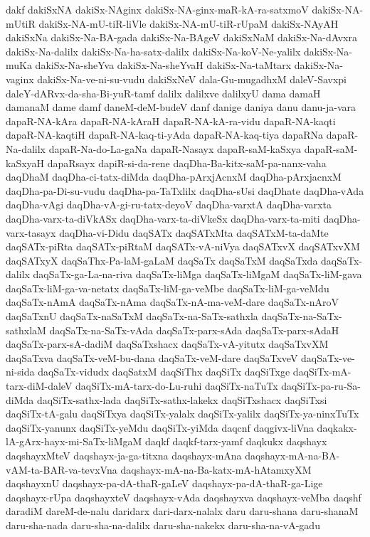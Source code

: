 {dakf
dakiSxNA
dakiSx-NAginx
dakiSx-NA-ginx-maR-kA-ra-satxmoV
dakiSx-NA-mUtiR
dakiSx-NA-mU-tiR-liVle
dakiSx-NA-mU-tiR-rUpaM
dakiSx-NAyAH
dakiSxNa
dakiSx-Na-BA-gada
dakiSx-Na-BAgeV
dakiSxNaM
dakiSx-Na-dAvxra
dakiSx-Na-dalilx
dakiSx-Na-ha-satx-dalilx
dakiSx-Na-koV-Ne-yalilx
dakiSx-Na-muKa
dakiSx-Na-sheYva
dakiSx-Na-sheYvaH
dakiSx-Na-taMtarx
dakiSx-Na-vaginx
dakiSx-Na-ve-ni-su-vudu
dakiSxNeV
dala-Gu-mugadhxM
daleV-Savxpi
daleY-dARvx-da-sha-Bi-yuR-tamf
dalilx
dalilxve
dalilxyU
dama
damaH
damanaM
dame
damf
daneM-deM-budeV
danf
danige
daniya
danu
danu-ja-vara
dapaR-NA-kAra
dapaR-NA-kAraH
dapaR-NA-kA-ra-vidu
dapaR-NA-kaqti
dapaR-NA-kaqtiH
dapaR-NA-kaq-ti-yAda
dapaR-NA-kaq-tiya
dapaRNa
dapaR-Na-dalilx
dapaR-Na-do-La-gaNa
dapaR-Nasayx
dapaR-saM-kaSxya
dapaR-saM-kaSxyaH
dapaRsayx
dapiR-si-da-rene
daqDha-Ba-kitx-saM-pa-nanx-vaha
daqDhaM
daqDha-ci-tatx-diMda
daqDha-pArxjAcnxM
daqDha-pArxjacnxM
daqDha-pa-Di-su-vudu
daqDha-pa-TaTxlilx
daqDha-sUsi
daqDhate
daqDha-vAda
daqDha-vAgi
daqDha-vA-gi-ru-tatx-deyoV
daqDha-varxtA
daqDha-varxta
daqDha-varx-ta-diVkASx
daqDha-varx-ta-diVkeSx
daqDha-varx-ta-miti
daqDha-varx-tasayx
daqDha-vi-Didu
daqSATx
daqSATxMta
daqSATxM-ta-daMte
daqSATx-piRta
daqSATx-piRtaM
daqSATx-vA-niVya
daqSATxvX
daqSATxvXM
daqSATxyX
daqSaThx-Pa-laM-gaLaM
daqSaTx
daqSaTxM
daqSaTxda
daqSaTx-dalilx
daqSaTx-ga-La-na-riva
daqSaTx-liMga
daqSaTx-liMgaM
daqSaTx-liM-gava
daqSaTx-liM-ga-va-netatx
daqSaTx-liM-ga-veMbe
daqSaTx-liM-ga-veMdu
daqSaTx-nAmA
daqSaTx-nAma
daqSaTx-nA-ma-veM-dare
daqSaTx-nAroV
daqSaTxnU
daqSaTx-naSaTxM
daqSaTx-na-SaTx-sathxla
daqSaTx-na-SaTx-sathxlaM
daqSaTx-na-SaTx-vAda
daqSaTx-parx-sAda
daqSaTx-parx-sAdaH
daqSaTx-parx-sA-dadiM
daqSaTxshacx
daqSaTx-vA-yitutx
daqSaTxvXM
daqSaTxva
daqSaTx-veM-bu-dana
daqSaTx-veM-dare
daqSaTxveV
daqSaTx-ve-ni-sida
daqSaTx-vidudx
daqSatxM
daqSiThx
daqSiTx
daqSiTxge
daqSiTx-mA-tarx-diM-daleV
daqSiTx-mA-tarx-do-Lu-ruhi
daqSiTx-naTuTx
daqSiTx-pa-ru-Sa-diMda
daqSiTx-sathx-lada
daqSiTx-sathx-lakekx
daqSiTxshacx
daqSiTxsi
daqSiTx-tA-galu
daqSiTxya
daqSiTx-yalalx
daqSiTx-yalilx
daqSiTx-ya-ninxTuTx
daqSiTx-yanunx
daqSiTx-yeMdu
daqSiTx-yiMda
daqcnf
daqgivx-liVna
daqkakx-lA-gArx-hayx-mi-SaTx-liMgaM
daqkf
daqkf-tarx-yamf
daqkukx
daqshayx
daqshayxMteV
daqshayx-ja-ga-titxna
daqshayx-mAna
daqshayx-mA-na-BA-vAM-ta-BAR-va-tevxVna
daqshayx-mA-na-Ba-katx-mA-hAtamxyXM
daqshayxnU
daqshayx-pa-dA-thaR-gaLeV
daqshayx-pa-dA-thaR-ga-Lige
daqshayx-rUpa
daqshayxteV
daqshayx-vAda
daqshayxva
daqshayx-veMba
daqshf
daradiM
dareM-de-nalu
daridarx
dari-darx-nalalx
daru
daru-shana
daru-shanaM
daru-sha-nada
daru-sha-na-dalilx
daru-sha-nakekx
daru-sha-na-vA-gadu
}
